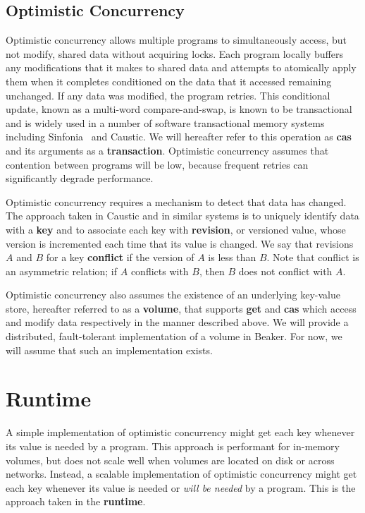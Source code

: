 \documentclass[../main.tex]{subfiles}
\begin{document}
  \subsection{Optimistic Concurrency}
  Optimistic concurrency allows multiple programs to simultaneously access, but not modify, shared
  data without acquiring locks. Each program locally buffers any modifications that it makes to
  shared data and attempts to atomically apply them when it completes conditioned on the data that
  it accessed remaining unchanged. If any data was modified, the program retries. This conditional
  update, known as a multi-word compare-and-swap, is known to be transactional and is widely used in
  a number of software transactional memory systems~\cite{stm} including Sinfonia~\cite{sinfonia}
  and Caustic. We will hereafter refer to this operation as \textbf{cas} and its arguments as a
  \textbf{transaction}. Optimistic concurrency assumes that contention between programs will be low,
  because frequent retries can significantly degrade performance.

  Optimistic concurrency requires a mechanism to detect that data has changed. The approach taken in
  Caustic and in similar systems is to uniquely identify data with a \textbf{key} and to associate
  each key with \textbf{revision}, or versioned value, whose version is incremented each time that
  its value is changed. We say that revisions $A$ and $B$ for a key \textbf{conflict} if the version
  of $A$ is less than $B$. Note that conflict is an asymmetric relation; if $A$ conflicts with $B$,
  then $B$ does not conflict with $A$.

  Optimistic concurrency also assumes the existence of an underlying key-value store, hereafter
  referred to as a \textbf{volume}, that supports \textbf{get} and \textbf{cas} which access and
  modify data respectively in the manner described above. We will provide a distributed,
  fault-tolerant implementation of a volume in Beaker. For now, we will assume that such an
  implementation exists.

\section{Runtime}
A simple implementation of optimistic concurrency might get each key whenever its value is needed
by a program. This approach is performant for in-memory volumes, but does not scale well when
volumes are located on disk or across networks. Instead, a scalable implementation of optimistic
concurrency might get each key whenever its value is needed or \emph{will be needed} by a program.
This is the approach taken in the \textbf{runtime}.
\end{document}
